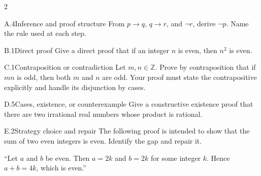 \documentclass[9pt]{extarticle}
\begin{document}
\begin{multicols}{2}
\begin{CoreProblem}{A.4}{Inference and proof structure}
From $p\to q$, $q\to r$, and $\neg r$, derive $\neg p$. Name the rule used at
each step.
\end{CoreProblem}
\begin{CoreProblem}{B.1}{Direct proof}
Give a direct proof that if an integer $n$ is even, then $n^2$ is even.
\end{CoreProblem}
\begin{CoreProblem}{C.1}{Contraposition or contradiction}
Let $m,n\in\mathbb Z$. Prove by contraposition that if $mn$ is odd, then both
$m$ and $n$ are odd. Your proof must state the contrapositive explicitly and
handle its disjunction by cases.
\end{CoreProblem}
\columnbreak
\begin{CoreProblem}{D.5}{Cases, existence, or counterexample}
Give a constructive existence proof that there are two irrational real numbers
whose product is rational.
\end{CoreProblem}
\begin{CoreProblem}{E.2}{Strategy choice and repair}
The following proof is intended to show that the sum of two even integers is even. Identify the gap and repair it.

``Let $a$ and $b$ be even. Then $a=2k$ and $b=2k$ for some integer $k$. Hence $a+b=4k$, which is even.''
\end{CoreProblem}
\end{multicols}
\CoreWorkArea
\FormBreak
{}
\end{document}
